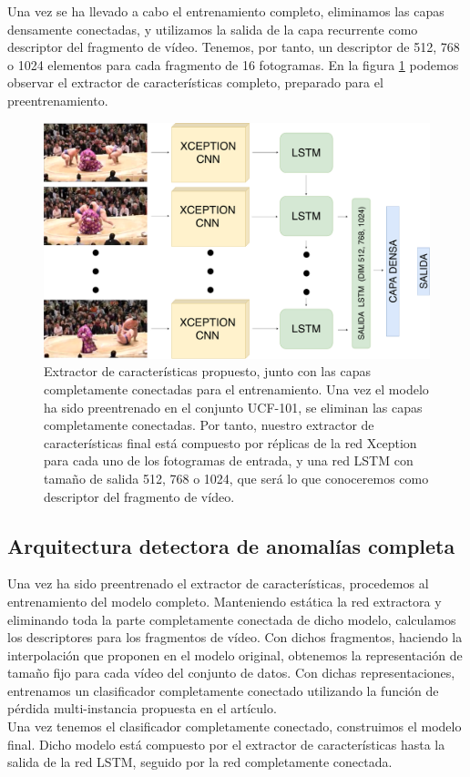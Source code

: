 \documentclass[../main.tex]{memoir}
\begin{document}
Una vez se ha llevado a cabo el entrenamiento completo, eliminamos las
capas densamente conectadas, y utilizamos la salida de la capa
recurrente como descriptor del fragmento de vídeo. Tenemos, por tanto,
un descriptor de 512, 768 o 1024 elementos para cada fragmento de 16
fotogramas. En la figura \ref{fig:cnn-lstm} podemos observar el
extractor de características completo, preparado para el
preentrenamiento.


\begin{figure}[hbtp]
  \centering
  \includegraphics[width=.9\textwidth]{images/cnn_lstm.pdf}
  \caption{Extractor de características propuesto, junto con las capas
    completamente conectadas para el entrenamiento. Una vez el modelo
    ha sido preentrenado en el conjunto UCF-101, se eliminan las capas
    completamente conectadas. Por tanto, nuestro extractor de
    características final está compuesto por réplicas de la red
    Xception para cada uno de los fotogramas de entrada, y una red
    LSTM con tamaño de salida 512, 768 o 1024, que será lo que
    conoceremos como descriptor del fragmento de vídeo.}
  \label{fig:cnn-lstm}
\end{figure}

\subsection{Arquitectura detectora de anomalías completa}

Una vez ha sido preentrenado el extractor de características,
procedemos al entrenamiento del modelo completo. Manteniendo estática
la red extractora y eliminando toda la parte completamente conectada
de dicho modelo, calculamos los descriptores para los fragmentos de
vídeo. Con dichos fragmentos, haciendo la interpolación que proponen
en el modelo original, obtenemos la representación de tamaño fijo para
cada vídeo del conjunto de datos. Con dichas representaciones,
entrenamos un clasificador completamente conectado utilizando la función
de pérdida multi-instancia propuesta en el artículo.\\

Una vez tenemos el clasificador completamente conectado, construimos
el modelo final. Dicho modelo está compuesto por el extractor de
características hasta la salida de la red LSTM, seguido por la red
completamente conectada.
\end{document}
